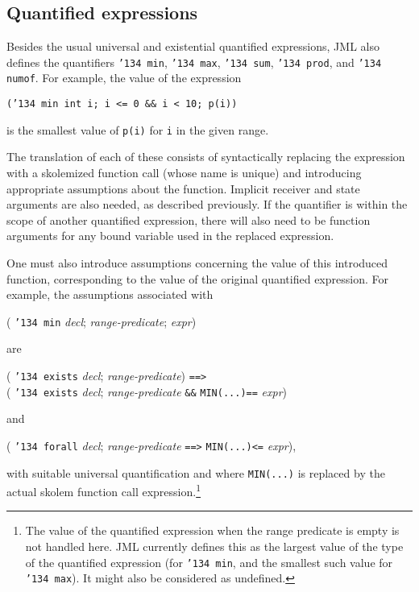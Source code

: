 \documentclass{sig-alternate2}
\begin{document}
\subsection{Quantified expressions}

Besides
the usual universal and existential quantified expressions, JML
also defines the quantifiers \texttt{\char'134 min}, \texttt{\char'134 max}, 
\texttt{\char'134 sum}, \texttt{\char'134 prod}, and \texttt{\char'134 numof}.  
For example, the value of the expression
\begin{center} \texttt{(\char'134 min int i; i <= 0 \&\& i < 10; p(i))} \end{center}
is the smallest value of \texttt{p(i)} for \texttt{i} in the given range. 

The translation of each of these consists of syntactically replacing the expression with a
skolemized function call (whose name is unique) and introducing appropriate assumptions about the
function.  Implicit receiver and state arguments are also needed,
as described previously.  If the quantifier is within the scope of another quantified
expression, there will also need to be function arguments for any bound variable used
in the replaced expression.

One must also introduce assumptions concerning the value of this introduced function, 
corresponding to the value of the original quantified expression.  For example, the
assumptions associated with
\begin{center} ( \texttt{\char'134 min} {\em decl}; {\em range-predicate}; {\em expr}) \end{center}
are 
\begin{center} ( \texttt{\char'134 exists} {\em decl}; {\em range-predicate}) \texttt{==>} \\
( \texttt{\char'134 exists} {\em decl}; {\em range-predicate} \texttt{\&\&} \texttt{MIN(...)==} {\em expr}) \end{center}
and
\begin{center} 
( \texttt{\char'134 forall} {\em decl}; {\em range-predicate} \texttt{==>} \texttt{MIN(...)<=} {\em expr}), \end{center}
with suitable universal quantification and 
where \texttt{MIN(...)} is replaced by the actual skolem function call 
expression.\footnote{The value of the quantified expression when the range predicate is empty is not handled here.  JML currently defines this as the largest value of the type of the quantified expression (for 
\texttt{\char'134 min}, and the smallest such value for \texttt{\char'134 max}).  It might also be considered as undefined.}
\end{document}
